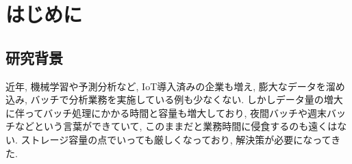 \documentclass[11pt]{jreport}
\begin{document}
\begin{abstract}
%
%

\end{abstract}

\tableofcontents



\newpage
{}	%



\chapter{はじめに}
\section{研究背景}
近年, 機械学習や予測分析など, IoT導入済みの企業も増え, 膨大なデータを溜め込み, バッチで分析業務を実施している例も少なくない. しかしデータ量の増大に伴ってバッチ処理にかかる時間と容量も増大しており, 夜間バッチや週末バッチなどという言葉ができていて, このままだと業務時間に侵食するのも遠くはない. ストレージ容量の点でいっても厳しくなっており, 解決策が必要になってきた.
\end{document}
